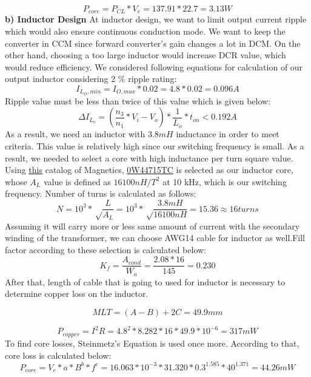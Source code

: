\documentclass{article}
\newcommand\tab[1][1cm]{\hspace*{#1}}
\begin{document}
\begin{equation*}
   P_{core}=P_{CL}*V_e=137.91*22.7=3.13 W
\end{equation*}
\tab\textbf{b) Inductor Design}
\newline \tab At inductor design, we want to limit output current ripple which would also ensure continuous conduction mode. We want to keep the converter in CCM since forward converter's gain changes a lot in DCM. On the other hand, choosing a too large inductor would increase DCR value, which would reduce efficiency. We considered following equations for calculation of our output inductor considering 2 \% ripple rating:
\begin{equation*}
    I_{L_O,min}=I_{O,max}*0.02 =4.8*0.02=0.096 A
\end{equation*}
Ripple value must be less than twice of this value which is given below:
\begin{equation*}
{\displaystyle \Delta }I_{L_o}=(\frac{n_3}{n_1}*V_i-V_o)*\frac{1}{L_o}*t_{on}<0.192 A
\end{equation*}
\tab As a result, we need an inductor with $3.8 mH$ inductance in order to meet criteria. This value is relatively high since our switching frequency is small. As a result, we needed to select a core with high inductance per turn square value. Using \href{https://www.mag-inc.com/getattachment/Products/Ferrite-Cores/Learn-More-about-Ferrite-Cores/Magnetics-Ferrite-Catalog-2017.pdf?lang=en-US}{this} catalog of Magnetics, \href{https://www.mag-inc.com/Media/Magnetics/Datasheets/0W44715TC.pdf}{0W44715TC} is selected as our inductor core, whose $A_L$ value is defined as $16100 nH/T^2$ at 10 kHz, which is our switching frequency. Number of turns is calculated as follows:
\begin{equation*}
    N=10^3*\sqrt\frac{L}{A_L}=10^3*\sqrt\frac{3.8 mH}{16100 nH}=15.36 \approx 16 turns
\end{equation*}
Assuming it will carry more or less same amount of current with the secondary winding of the transformer, we can choose AWG14 cable for inductor as well.Fill factor according to these selection is calculated below:
\begin{equation*}
    K_f=\frac{A_{cond}}{W_a}=\frac{2.08*16}{145}=0.230
\end{equation*}
After that, length of cable that is going to used for inductor is necessary to determine copper loss on the inductor. 

\begin{equation*}
    MLT=(A-B)+2C=49.9 mm
\end{equation*}

\begin{equation*}
    P_{copper}=I^2R=4.8^2*8.282*16*49.9*10^{-6}=317 mW
\end{equation*}
\tab To find core losses, Steinmetz's Equation is used once more.  According to that, core loss is calculated below:
\begin{equation*}
    P_{core}=V_e*a*B^b*f^c=16.063*10^{-3}*31.320*0.3^{1.585}*40^1.371=44.26 mW
\end{equation*}
\end{document}
